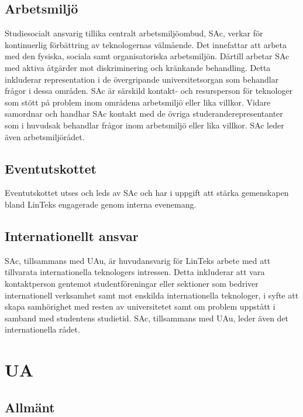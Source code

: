 \hypertarget{arbetsmiljuxf6}{%
\subsection{Arbetsmiljö}\label{arbetsmiljuxf6}}

Studiesocialt ansvarig tillika centralt arbetsmiljöombud, SAc, verkar
för kontinuerlig förbättring av teknologernas välmående. Det innefattar
att arbeta med den fysiska, sociala samt organisatoriska arbetsmiljön.
Därtill arbetar SAc med aktiva åtgärder mot diskriminering och kränkande
behandling. Detta inkluderar representation i de övergripande
universitetsorgan som behandlar frågor i dessa områden. SAc är särskild
kontakt- och resursperson för teknologer som stött på problem inom
områdena arbetsmiljö eller lika villkor. Vidare samordnar och handhar
SAc kontakt med de övriga studeranderepresentanter som i huvudsak
behandlar frågor inom arbetsmiljö eller lika villkor. SAc leder även
arbetsmiljörådet.

\hypertarget{eventutskottet}{%
\subsection{Eventutskottet}\label{eventutskottet}}

Eventutskottet utses och leds av SAc och har i uppgift att stärka
gemenskapen bland LinTeks engagerade genom interna evenemang.

\hypertarget{internationellt-ansvar}{%
\subsection{Internationellt ansvar}\label{internationellt-ansvar}}

SAc, tillsammans med UAu, är huvudansvarig för LinTeks arbete med att
tillvarata internationella teknologers intressen. Detta inkluderar att
vara kontaktperson gentemot studentföreningar eller sektioner som
bedriver internationell verksamhet samt mot enskilda internationella
teknologer, i syfte att skapa samhörighet med resten av universitetet
samt om problem uppstått i samband med studentens studietid. SAc,
tillsammans med UAu, leder även det internationella rådet.

\hypertarget{ua}{%
\section{UA}\label{ua}}

\hypertarget{allmuxe4nt-3}{%
\subsection{Allmänt}\label{allmuxe4nt-3}}

